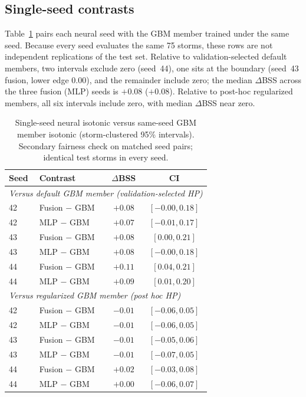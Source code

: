 \documentclass[11pt]{article}
\begin{document}
\subsection{Single-seed contrasts}

Table~\ref{tab:singleseed} pairs each neural seed with the GBM member trained under the same seed. Because every seed evaluates the same 75 storms, these rows are not independent replications of the test set. Relative to validation-selected default members, two intervals exclude zero (seed~44), one sits at the boundary (seed~43 fusion, lower edge $0.00$), and the remainder include zero; the median $\Delta$BSS across the three fusion (MLP) seeds is $+0.08$ ($+0.08$). Relative to post-hoc regularized members, all six intervals include zero, with median $\Delta$BSS near zero.

\begin{table}[H]
\centering
\caption{Single-seed neural isotonic versus same-seed GBM member isotonic (storm-clustered 95\% intervals). Secondary fairness check on matched seed pairs; identical test storms in every seed.}
\label{tab:singleseed}
\begin{tabular}{llcc}
\toprule
Seed & Contrast & $\Delta$BSS & CI \\
\midrule
\multicolumn{4}{l}{\emph{Versus default GBM member (validation-selected HP)}} \\
42 & Fusion $-$ GBM & $+0.08$ & $[-0.00,0.18]$ \\
42 & MLP $-$ GBM & $+0.07$ & $[-0.01,0.17]$ \\
43 & Fusion $-$ GBM & $+0.08$ & $[0.00,0.21]$ \\
43 & MLP $-$ GBM & $+0.08$ & $[-0.00,0.18]$ \\
44 & Fusion $-$ GBM & $+0.11$ & $[0.04,0.21]$ \\
44 & MLP $-$ GBM & $+0.09$ & $[0.01,0.20]$ \\
\midrule
\multicolumn{4}{l}{\emph{Versus regularized GBM member (post hoc HP)}} \\
42 & Fusion $-$ GBM & $-0.01$ & $[-0.06,0.05]$ \\
42 & MLP $-$ GBM & $-0.01$ & $[-0.06,0.05]$ \\
43 & Fusion $-$ GBM & $-0.01$ & $[-0.05,0.06]$ \\
43 & MLP $-$ GBM & $-0.01$ & $[-0.07,0.05]$ \\
44 & Fusion $-$ GBM & $+0.02$ & $[-0.03,0.08]$ \\
44 & MLP $-$ GBM & $+0.00$ & $[-0.06,0.07]$ \\
\bottomrule
\end{tabular}
\end{table}
\end{document}

